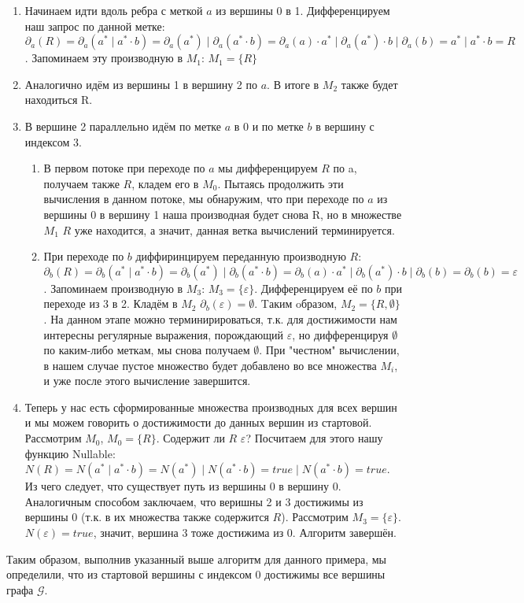 \begin{example}
\begin{enumerate}
    \item Начинаем идти вдоль ребра с меткой $a$ из вершины 0 в 1. Дифференцируем наш запрос по данной метке: $\partial_{a}(R) = \partial_{a}(a^* \mid a^* \cdot b) = \partial_{a}(a^*) \mid \partial_{a}(a^* \cdot b) = \partial_{a}(a) \cdot a^* \mid \partial_{a}(a^*) \cdot b \mid \partial_{a}(b) = a^* \mid a^* \cdot b = R$. Запоминаем эту производную в $M_{1}$:  $M_{1} = \{R\}$ 
    \item Аналогично идём из вершины 1 в вершину 2 по $a$. В итоге в $M_{2}$ также будет находиться R.
    \item В вершине 2 параллельно идём по метке $a$ в 0 и по метке $b$ в вершину с индексом 3. 
    \begin{enumerate}
        \item В первом потоке при переходе по $a$ мы дифференцируем $R$ по a, получаем также $R$, кладем его в $M_{0}$. Пытаясь продолжить эти вычисления в данном потоке, мы обнаружим, что при переходе по $a$ из вершины 0 в вершину 1 наша производная будет снова R, но в множестве $M_{1}$ $R$ уже находится, а значит, данная ветка вычислений терминируется.
        \item При переходе по $b$ диффиринцируем переданную производную $R$: $\partial_{b}(R) = \partial_{b}(a^* \mid a^* \cdot b) = \partial_{b}(a^*) \mid \partial_{b}(a^* \cdot b) = \partial_{b}(a) \cdot a^* \mid \partial_{b}(a^*) \cdot b \mid \partial_{b}(b) = \partial_{b}(b) = \varepsilon$. Запоминаем производную в $M_{3}$:  $M_{3} = \{\varepsilon\}$. Дифференцируем её по $b$ при переходе из 3 в 2. Кладём в $M_{2}$ $\partial_{b}(\varepsilon) = \emptyset$. Tаким oбразом, $M_{2} = \{R, \emptyset\}$. На данном этапе можно терминирироваться, т.к. для достижимости нам интересны регулярные выражения, порождающий $\varepsilon$, но дифференцируя $\emptyset$ по каким-либо меткам, мы снова получаем $\emptyset$. При "честном" вычислении, в нашем случае пустое множество будет добавлено во все множества $M_{i}$, и уже после этого вычисление завершится.    
    \end{enumerate}
    \item Теперь у нас есть сформированные множества производных для всех вершин и мы можем говорить о достижимости до данных вершин из стартовой. Рассмотрим $M_{0}$, $M_{0} = \{R\}$. Содержит ли $R$ $\varepsilon$? Посчитаем для этого нашу функцию Nullable: $N(R) = N(a^* \mid a^* \cdot b) = N(a^*) \mid N(a^* \cdot b) = true \mid N(a^* \cdot b) = true$. Из чего следует, что существует путь из вершины 0 в вершину 0. Аналогичным способом заключаем, что веришны 2 и 3 достижимы из вершины 0 (т.к. в их множества также содержится $R$). Рассмотрим $M_{3} = \{\varepsilon\}$. $N(\varepsilon) = true$, значит, вершина  3 тоже достижима из 0. Алгоритм завершён.
\end{enumerate}

Таким образом, выполнив указанный выше алгоритм для данного примера, мы определили, что из стартовой вершины с индексом 0 достижимы все вершины графа $\mathcal{G}$.
\end{example}

